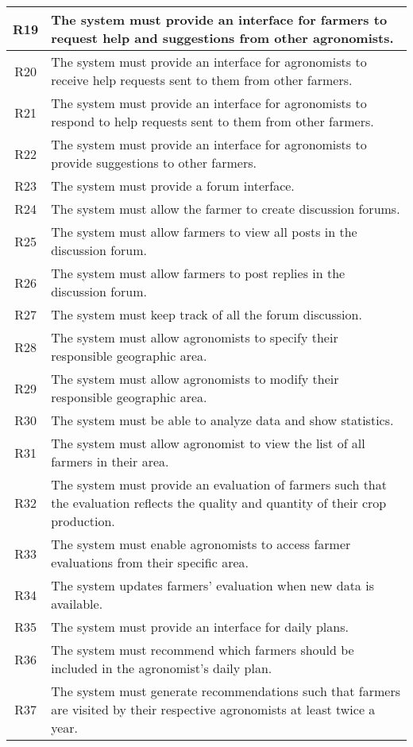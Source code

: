 \begin{longtable}{|c|>{\raggedright\arraybackslash}m{15cm}|}
R19	& The system must provide an interface for farmers to request help and suggestions from other agronomists.\\\hline
R20	& The system must provide an interface for agronomists to receive help requests sent to them from other farmers.\\\hline
R21	& The system must provide an interface for agronomists to respond to help requests sent to them from other farmers.\\\hline
R22	& The system must provide an interface for agronomists to provide suggestions to other farmers.\\\hline
R23	& The system must provide a forum interface.\\\hline
R24	& The system must allow the farmer to create discussion forums.\\\hline
R25	& The system must allow farmers to view all posts in the discussion forum.\\\hline
R26	& The system must allow farmers to post replies in the discussion forum.\\\hline
R27	& The system must keep track of all the forum discussion.\\\hline
R28	& The system must allow agronomists to specify their responsible geographic area.\\\hline
R29	& The system must allow agronomists to modify their responsible geographic area.\\\hline 
R30	& The system must be able to analyze data and show statistics.\\\hline
R31	& The system must allow agronomist to view the list of all farmers in their area. \\\hline
R32	& The system must provide an evaluation of farmers such that the evaluation reflects the quality and quantity of their crop production.\\\hline
R33	& The system must enable agronomists to access farmer evaluations from their specific area.\\\hline
R34	& The system updates farmers' evaluation when new data is available.\\\hline %
R35	& The system must provide an interface for daily plans.\\\hline
R36	& The system must recommend which farmers should be included in the agronomist's daily plan.\\\hline
R37	& The system must generate recommendations such that farmers are visited by their respective agronomists at least twice a year.\\\hline

\end{longtable}
